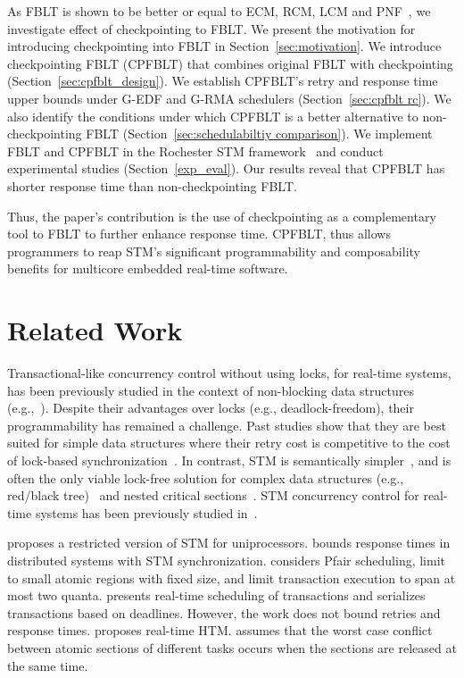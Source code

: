 \documentclass[conference]{IEEEtran}
\begin{document}
As FBLT is shown to be better or equal to ECM, RCM, LCM and PNF~\cite{fblt}, we investigate effect of checkpointing to FBLT. We present the motivation for introducing checkpointing into FBLT in Section~\ref{sec:motivation}. We introduce checkpointing FBLT (CPFBLT) that combines original FBLT with checkpointing (Section~\ref{sec:cpfblt_design}). We establish CPFBLT's retry and response time upper bounds under G-EDF and G-RMA schedulers (Section~\ref{sec:cpfblt rc}). We also identify the conditions under which CPFBLT is a better alternative to non-checkpointing FBLT (Section~\ref{sec:schedulabiltiy comparison}). We implement FBLT and CPFBLT in the Rochester STM framework~\cite{marathe2006lowering} and conduct experimental studies (Section~\ref{exp_eval}). Our results reveal that CPFBLT has shorter response time than non-checkpointing FBLT.

Thus, the paper's contribution is the use of checkpointing as a complementary tool to FBLT to further enhance response time. CPFBLT, thus allows programmers to reap STM's significant programmability and composability benefits for multicore embedded real-time software.

\section{Related Work}
\label{sec:past}

Transactional-like concurrency control without using locks, for real-time systems, has been previously studied in the context of non-blocking data structures (e.g.,~\cite{anderson95realtime}). Despite their advantages over locks 
(e.g., deadlock-freedom), their programmability has remained a challenge. Past studies show that they are best suited for simple data structures where their retry cost is competitive to the cost of lock-based synchronization~\cite{bc+08}.  In contrast, STM is semantically simpler~\cite{Herlihy:2006:AMP:1146381.1146382}, and is often the only viable lock-free solution for complex data structures (e.g., red/black tree)~\cite{key-1} and nested critical sections~\cite{Saha:2006:MHP:1122971.1123001}. STM concurrency control for real-time systems has been previously studied in~\cite{manson2006preemptible,fahmy2009bounding,sarni2009real,schoeberl2010rttm,key-1,barrosmanaging,stmconcurrencycontrol:emsoft11,lcmdac2012,pnf_dac_asp,fblt}.

\cite{manson2006preemptible} proposes a restricted version of STM for uniprocessors. \cite{fahmy2009bounding} bounds response times in distributed  systems with STM synchronization. \cite{fahmy2009bounding} considers Pfair scheduling, limit to small atomic regions with fixed size, and limit transaction execution to span at most two quanta. \cite{sarni2009real} presents real-time scheduling of transactions and serializes transactions based on deadlines. However, the work does not bound retries and response times. \cite{schoeberl2010rttm} proposes real-time HTM. \cite{schoeberl2010rttm} assumes that the worst case conflict between atomic sections of different tasks occurs when the sections are released at the same time. 
\end{document}
